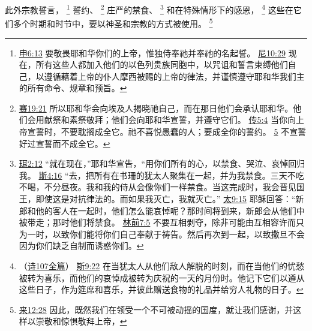 \documentclass[12pt, a4paper, oneside]{ctexart}
\begin{document}
	此外宗教誓言，
	\footnote {
		\href{https://biblehub.com/deuteronomy/6-13.htm}{申6:13} 要敬畏耶和华你们的上帝，惟独侍奉祂并奉祂的名起誓。
		\href{https://biblehub.com/nehemiah/10-29.htm}{尼10:29} 现在，所有这些人都加入他们的以色列贵族同胞中，以咒诅和誓言束缚他们自己，以遵循藉着上帝的仆人摩西被赐的上帝的律法，并谨慎遵守耶和华我们主的所有命令、规章和预旨。
	}
	誓约、
	\footnote {
		\href{https://biblehub.com/isaiah/19-21.htm}{赛19:21} 所以耶和华会向埃及人揭晓祂自己，而在那日他们会承认耶和华。他们会用献祭和素祭敬拜；他们会向耶和华宣誓，并遵守它们。
		\href{https://biblehub.com/ecclesiastes/5-4.htm}{传5:4} 当你向上帝宣誓时，不要耽搁成全它。祂不喜悦愚蠢的人；要成全你的誓约。
		\href{https://biblehub.com/ecclesiastes/5-5.htm}{5} 不宣誓好过宣誓而不成全它。
	}
	庄严的禁食、
	\footnote {
		\href{https://biblehub.com/joel/2-12.htm}{珥2:12} “就在现在，”耶和华宣告，“用你们所有的心，以禁食、哭泣、哀悼回归我。
		\href{https://biblehub.com/esther/4-16.htm}{斯4:16} “去，把所有在书珊的犹太人聚集在一起，并为我禁食。三天不吃不喝，不分昼夜。我和我的侍从会像你们一样禁食。当这完成时，我会晋见国王，即使这是对抗律法的。而如果我灭亡，我就灭亡。”
		\href{https://biblehub.com/matthew/9-15.htm}{太9:15} 耶稣回答：“新郎和他的客人在一起时，他们怎么能哀悼呢？那时间将到来，新郎会从他们中被带走；那时他们将禁食。
		\href{https://biblehub.com/1_corinthians/7-5.htm}{林前7:5} 不要互相剥夺，除非可能由互相容许而只为一时，以致你们能将你们自己奉献于祷告。然后再次到一起，以致撒旦不会因为你们缺乏自制而诱惑你们。
	}
	和在特殊情形下的感恩，
	\footnote {
		（\href{https://biblehub.com/niv/psalms/107.htm}{诗107全篇}）
		\href{https://biblehub.com/esther/9-22.htm}{斯9:22} 在当犹太人从他们敌人解脱的时刻，而在当他们的忧愁被转为喜乐，而他们的哀悼成被转为庆祝的一天的月份时。他记下它们以遵从这些日子，作为筵席和喜乐，并彼此赠送食物的礼品并给穷人礼物的日子。
	}
	这些在它们多个时期和时节中，要以神圣和宗教的方式被使用。
	\footnote {
		\href{https://biblehub.com/hebrews/12-28.htm}{来12:28} 因此，既然我们在领受一个不可被动摇的国度，就让我们感谢，并这样以崇敬和惊惧敬拜上帝，
	}
\end{document}
